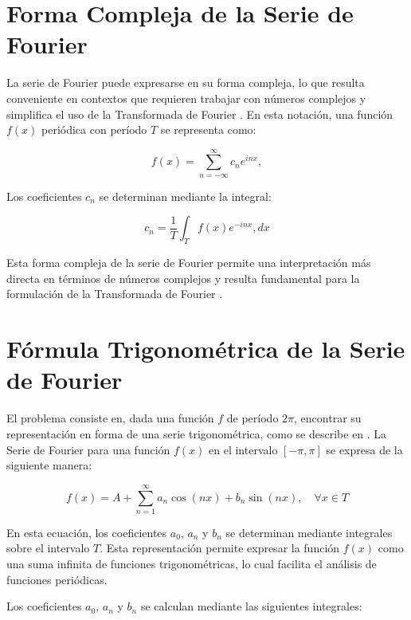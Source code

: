 {\section{Forma Compleja de la Serie de Fourier}
La serie de Fourier puede expresarse en su forma compleja, lo que resulta conveniente en contextos que requieren trabajar con números complejos y simplifica el uso de la Transformada de Fourier \cite{DiagoNanez2023}.  En esta notación, una función \(f(x)\) periódica con período \(T\) se representa como:

\begin{equation} f(x) = \sum_{n=-\infty}^{\infty} c_n e^{i n x}, \end{equation}
\vspace{10pt}

Los coeficientes \(c_n\) se determinan mediante la integral:

\begin{equation} c_n = \frac{1}{T} \int_T f(x) e^{-i n x} , dx \end{equation}

Esta forma compleja de la serie de Fourier permite una interpretación más directa en términos de números complejos y resulta fundamental para la formulación de la Transformada de Fourier \cite{Oppenheim1999, DiagoNanez2023}.

\section{Fórmula Trigonométrica de la Serie de Fourier}

El problema consiste en, dada una función \( f \) de período \( 2\pi \), encontrar su representación en forma de una serie trigonométrica, como se describe en \cite{Arenas2014}. La Serie de Fourier para una función \( f(x) \) en el intervalo \( [-\pi, \pi] \) se expresa de la siguiente manera:

\begin{equation}
\label{eq:fourier}
f(x) = A + \sum_{n=1}^{\infty} a_n \cos(nx) + b_n \sin(nx), \quad \forall x \in T
\end{equation}

En esta ecuación, los coeficientes \( a_0 \), \( a_n \) y \( b_n \) se determinan mediante integrales sobre el intervalo \( T \). Esta representación permite expresar la función \( f(x) \) como una suma infinita de funciones trigonométricas, lo cual facilita el análisis de funciones periódicas.

Los coeficientes \( a_0 \), \( a_n \) y \( b_n \) se calculan mediante las siguientes integrales:
\vspace{10pt}

}
